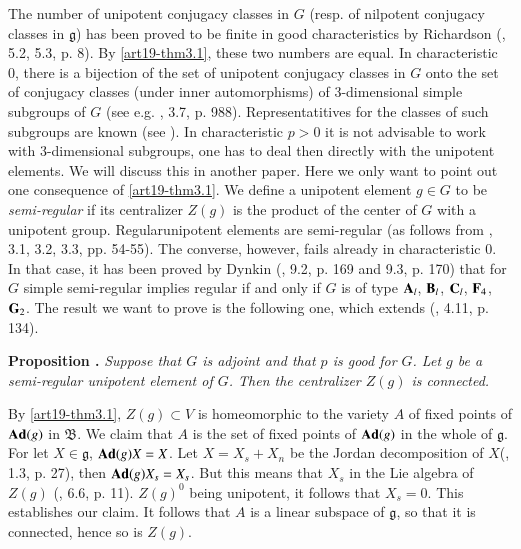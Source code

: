 The number of unipotent conjugacy classes in $G$ (resp. of nilpotent conjugacy classes in $\mathfrak{g}$) has been proved to be finite in good characteristics by Richardson (\cite{art19-key10}, 5.2, 5.3, p. 8). By \ref{art19-thm3.1}, these two numbers are equal. In characteristic 0, there is a bijection of the set of unipotent conjugacy classes in $G$ onto the set of conjugacy classes (under inner automorphisms) of 3-dimensional simple subgroups of $G$ (see e.g. \cite{art19-key8}, 3.7, p. 988). Representatitives for the classes of such subgroups are known (see \cite{art19-key6}). In characteristic $p>0$ it is not advisable to work with 3-dimensional subgroups, one has to deal then directly with the unipotent elements. We will discuss this in another paper. Here we only want to point out one consequence of \ref{art19-thm3.1}. We define a unipotent element $g\in G$ to be {\em semi-regular} if its centralizer $Z(g)$ is the product of the center of $G$ with a unipotent group. Regular\pageoriginale unipotent elements are semi-regular (as follows from \cite{art19-key15}, 3.1, 3.2, 3.3, pp. 54-55). The converse, however, fails already in characteristic 0. In that case, it has been proved by Dynkin (\cite{art19-key6}, 9.2, p. 169 and 9.3, p. 170) that for $G$ simple semi-regular implies regular if and only if $G$ is of type $\mathbf{A}_{l}$, $\mathbf{B}_{l}$, $\mathbf{C}_{l}$, $\mathbf{F}_{4}$, $\mathbf{G}_{2}$. The result we want to prove is the following one, which extends (\cite{art19-key14}, 4.11, p. 134).

\medskip
\noindent
{\bf Proposition .\label{art19-prop4.6}}
{\em Suppose that $G$ is adjoint and that $p$ is good for $G$. Let $g$ be a semi-regular unipotent element of $G$. Then the centralizer $Z(g)$ is connected.}
\smallskip

By \ref{art19-thm3.1}, $Z(g)\subset V$ is homeomorphic to the variety $A$ of fixed points of $\mathbf{Ad}(g)$ in $\mathfrak{B}$. We claim that $A$ is the set of fixed points of $\mathbf{Ad}(g)$ in the whole of $\mathfrak{g}$. For let $X\in \mathfrak{g}$, $\mathbf{Ad}(g)X=X$. Let $X=X_{s}+X_{n}$ be the Jordan decomposition of $X$(\cite{art19-key1}, 1.3, p. 27), then $\mathbf{Ad}(g)X_{s}=X_{s}$. But this means that $X_{s}$ in the Lie algebra of $Z(g)$ (\cite{art19-key10}, 6.6, p. 11). $Z(g)^{0}$ being unipotent, it follows that $X_{s}=0$. This establishes our claim. It follows that $A$ is a linear subspace of $\mathfrak{g}$, so that it is connected, hence so is $Z(g)$.

